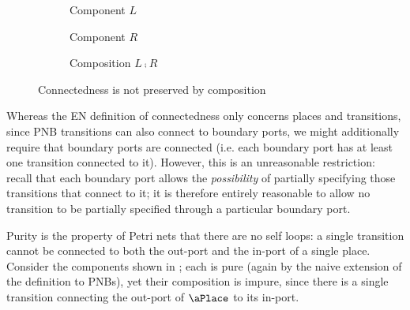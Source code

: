 \begin{figure}[ht]
    \centering
    \begin{subfigure}{0.33\textwidth}
    \centering
    \caption{Component $L$}
    \end{subfigure}%
    \begin{subfigure}{0.33\textwidth}
    \centering
    \caption{Component $R$}
    \end{subfigure}
    \begin{subfigure}{0.33\textwidth}
    \centering
    \caption{Composition $L \comp R$}
    \end{subfigure}
    \caption{Connectedness is not preserved by composition}
    \label{fig:connectedComponents}
\end{figure}

Whereas the EN definition of connectedness only concerns places and
transitions, since PNB transitions can also connect to boundary ports, we might
additionally require that boundary ports are connected (i.e. each boundary port
has at least one transition connected to it). However, this is an unreasonable
restriction: recall that each boundary port allows the \emph{possibility} of
partially specifying those transitions that connect to it; it is therefore
entirely reasonable to allow no transition to be partially specified through a
particular boundary port.

Purity is the property of Petri nets that there are no self loops: a single
transition cannot be connected to both the out-port and the in-port of a single
place. Consider the components shown in ; each is
pure (again by the naive extension of the definition to PNBs), yet their
composition is impure, since there is a single transition connecting the
out-port of $\aPlace$ to its in-port.

